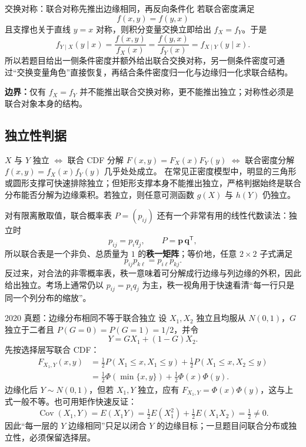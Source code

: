\documentclass[11pt,a4paper]{ctexart}
\newcommand{\kw}[1]{\textbf{\color{deep}#1}}
\begin{document}
\begin{methodbox}{交换对称：联合对称先推出边缘相同，再反向条件化}
若联合密度满足
\[
f(x,y)=f(y,x)
\]
且支撑也关于直线 $y=x$ 对称，则积分变量交换立即给出 $f_X=f_Y$。于是
\[
f_{Y\mid X}(y\mid x)
=\frac{f(x,y)}{f_X(x)}
=\frac{f(y,x)}{f_Y(x)}
=f_{X\mid Y}(y\mid x).
\]
所以若题目给出一侧条件密度并额外给出联合交换对称，另一侧条件密度可通过“交换变量角色”直接恢复，再结合条件密度归一化与边缘归一化求联合结构。

\textbf{边界：}仅有 $f_X=f_Y$ 并不能推出联合交换对称，更不能推出独立；对称性必须是联合对象本身的结构。
\end{methodbox}

\subsection{独立性判据}

$X$ 与 $Y$ 独立 $\iff$ 联合 CDF 分解 $F(x,y) = F_X(x) F_Y(y)$ $\iff$ 联合密度分解 $f(x,y) = f_X(x) f_Y(y)$ 几乎处处成立。
在常见正密度模型中，明显的三角形或圆形支撑可快速排除独立；但矩形支撑本身不能推出独立，严格判据始终是联合分布能否分解为边缘乘积。若独立，则任意可测函数 $g(X)$ 与 $h(Y)$ 仍独立。

对有限离散取值，联合概率表 $P=(p_{ij})$ 还有一个非常有用的线性代数读法：独立时
\[
p_{ij}=p_iq_j,
\qquad
P=\boldsymbol p\,\boldsymbol q^{\mathsf T},
\]
所以联合表是一个非负、总质量为 $1$ 的\kw{秩一矩阵}；等价地，任意 $2\times2$ 子式满足
\[
p_{ij}p_{k\ell}=p_{i\ell}p_{kj}.
\]
反过来，对合法的非零概率表，秩一意味着可分解成行边缘与列边缘的外积，因此给出独立。考场上通常仍以 $p_{ij}=p_iq_j$ 为主，秩一视角用于快速看清“每一行只是同一个列分布的缩放”。

\begin{examplebox}{2020 真题：边缘分布相同不等于联合独立}
设 $X_1,X_2$ 独立且均服从 $N(0,1)$，$G$ 独立于二者且 $P(G=0)=P(G=1)=1/2$，并令
\[
Y=GX_1+(1-G)X_2.
\]
先按选择层写联合 CDF：
\[
\begin{aligned}
F_{X_1,Y}(x,y)
&=\frac12P(X_1\le x,X_1\le y)
 +\frac12P(X_1\le x,X_2\le y)\\
&=\frac12\Phi(\min\{x,y\})+\frac12\Phi(x)\Phi(y).
\end{aligned}
\]
边缘化后 $Y\sim N(0,1)$，但若 $X_1,Y$ 独立，应有 $F_{X_1,Y}=\Phi(x)\Phi(y)$，这与上式一般不等。也可用矩作快速反证：
\[
\operatorname{Cov}(X_1,Y)=E(X_1Y)=\tfrac12E(X_1^2)+\tfrac12E(X_1X_2)=\tfrac12\ne0.
\]
因此“每一层的 $Y$ 边缘相同”只足以闭合 $Y$ 的边缘目标；一旦题目问联合分布或独立性，必须保留选择层。
\end{examplebox}
\end{document}
